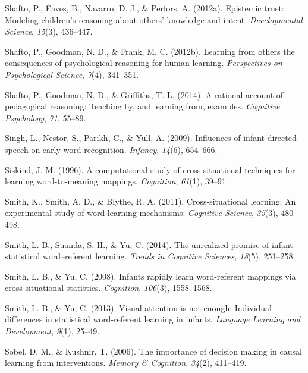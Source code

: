 \documentclass[oneside]{report}
\begin{document}
\leavevmode\hypertarget{ref-shafto2012epistemic}{}%
Shafto, P., Eaves, B., Navarro, D. J., \& Perfors, A. (2012a). Epistemic
trust: Modeling children's reasoning about others' knowledge and intent.
\emph{Developmental Science}, \emph{15}(3), 436--447.

\leavevmode\hypertarget{ref-shafto2012learning}{}%
Shafto, P., Goodman, N. D., \& Frank, M. C. (2012b). Learning from
others the consequences of psychological reasoning for human learning.
\emph{Perspectives on Psychological Science}, \emph{7}(4), 341--351.

\leavevmode\hypertarget{ref-shafto2014rational}{}%
Shafto, P., Goodman, N. D., \& Griffiths, T. L. (2014). A rational
account of pedagogical reasoning: Teaching by, and learning from,
examples. \emph{Cognitive Psychology}, \emph{71}, 55--89.

\leavevmode\hypertarget{ref-singh2009influences}{}%
Singh, L., Nestor, S., Parikh, C., \& Yull, A. (2009). Influences of
infant-directed speech on early word recognition. \emph{Infancy},
\emph{14}(6), 654--666.

\leavevmode\hypertarget{ref-siskind1996computational}{}%
Siskind, J. M. (1996). A computational study of cross-situational
techniques for learning word-to-meaning mappings. \emph{Cognition},
\emph{61}(1), 39--91.

\leavevmode\hypertarget{ref-smith2011cross}{}%
Smith, K., Smith, A. D., \& Blythe, R. A. (2011). Cross-situational
learning: An experimental study of word-learning mechanisms.
\emph{Cognitive Science}, \emph{35}(3), 480--498.

\leavevmode\hypertarget{ref-smith2014unrealized}{}%
Smith, L. B., Suanda, S. H., \& Yu, C. (2014). The unrealized promise of
infant statistical word--referent learning. \emph{Trends in Cognitive
Sciences}, \emph{18}(5), 251--258.

\leavevmode\hypertarget{ref-smith2008infants}{}%
Smith, L. B., \& Yu, C. (2008). Infants rapidly learn word-referent
mappings via cross-situational statistics. \emph{Cognition},
\emph{106}(3), 1558--1568.

\leavevmode\hypertarget{ref-smith2013visual}{}%
Smith, L. B., \& Yu, C. (2013). Visual attention is not enough:
Individual differences in statistical word-referent learning in infants.
\emph{Language Learning and Development}, \emph{9}(1), 25--49.

\leavevmode\hypertarget{ref-sobel2006importance}{}%
Sobel, D. M., \& Kushnir, T. (2006). The importance of decision making
in causal learning from interventions. \emph{Memory \& Cognition},
\emph{34}(2), 411--419.
\end{document}
